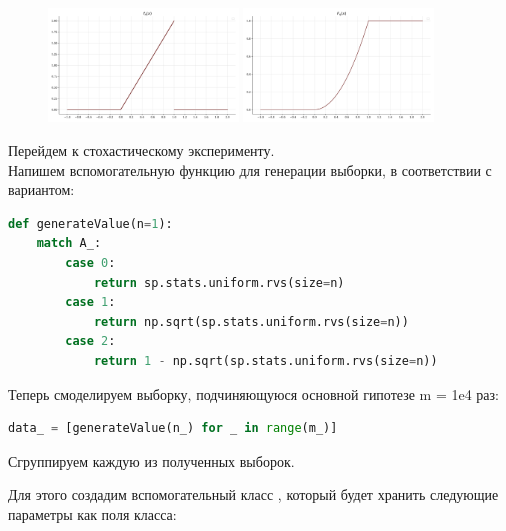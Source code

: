 \documentclass[a4paper, 14pt]{extarticle}
\begin{document}
\begin{figure}[h]
  \centering
  \includegraphics[width=0.45\textwidth, height=0.45\textheight, keepaspectratio]{modified_uniform_pdf}
  \hspace{0.05\textwidth}
  \includegraphics[width=0.45\textwidth, height=0.45\textheight, keepaspectratio]{modifed_uniform_cdf}
\end{figure}

Перейдем к стохастическому эксперименту.\\
Напишем вспомогательную функцию для генерации выборки, в соответствии с вариантом:

\begin{center}
  \begin{lstlisting}[language=Python]
def generateValue(n=1):
    match A_:
        case 0:
            return sp.stats.uniform.rvs(size=n)
        case 1:
            return np.sqrt(sp.stats.uniform.rvs(size=n))
        case 2:
            return 1 - np.sqrt(sp.stats.uniform.rvs(size=n))
  \end{lstlisting}
\end{center}

Теперь смоделируем выборку, подчиняющуюся основной гипотезе m = 1e4 раз:

\begin{center}
  \begin{lstlisting}[language=Python]
data_ = [generateValue(n_) for _ in range(m_)]
  \end{lstlisting}
\end{center}

Сгруппируем каждую из полученных выборок. 

Для этого создадим вспомогательный класс , который будет хранить 
следующие параметры как поля класса:
\end{document}
